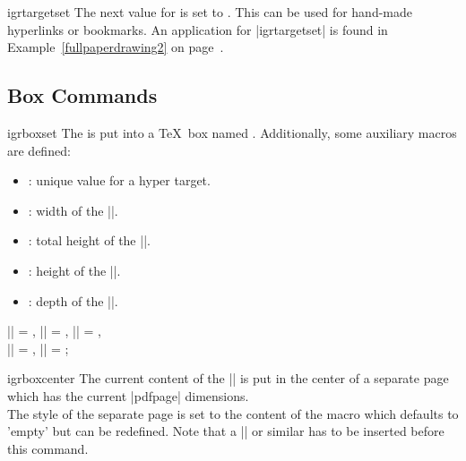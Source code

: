 \documentclass[a4paper,11pt]{ltxdoc}
\begin{document}
\begin{docCommand}{igrtargetset}{}
  The next value for  is set to .
  This can be used for hand-made hyperlinks or bookmarks.
  An application for |igrtargetset| is found in Example~\ref{fullpaperdrawing2}
  on page~\pageref{fullpaperdrawing2}.
\end{docCommand}

\clearpage
\subsection{Box Commands}

\begin{docCommand}{igrboxset}{}
  The  is put into a \TeX\ box named .
  Additionally, some auxiliary macros are defined:
  \begin{itemize}
  \item{}: unique value for a hyper target.
  \item{}: width of the |\igrbox|.
  \item{}: total height of the |\igrbox|.
  \item{}: height of the |\igrbox|.
  \item{}: depth of the |\igrbox|.
  \end{itemize}
\begin{dispExample}
  |\igrAutoTarget| = \igrAutoTarget, |\igrBoxWidth| = \igrBoxWidth,
  |\igrBoxHeight| = \igrBoxHeight,\\
  |\igrBoxht| = \igrBoxht, |\igrBoxdp| = \igrBoxdp;
\end{dispExample}
\end{docCommand}

\begin{docCommand}{igrboxcenter}{}
  The current content of the |\igrbox|
  is put in the center of a separate page which has the
  current |pdfpage| dimensions.\\ 
  The style of the separate page is set to
  the content of the macro
   which defaults to 'empty' but can be
  redefined.
  Note that a |\clearpage| or similar has to be inserted before this command.
\end{docCommand}
\end{document}
